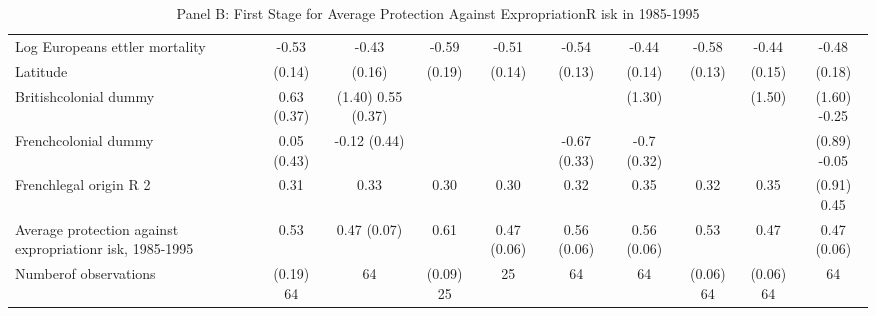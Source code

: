 \begin{table}[htbp]
\centering
\caption{Panel B: First Stage for Average Protection Against ExpropriationR isk in 1985-1995}
\begin{tabular}{lccccccccc}
\hline
Log Europeans ettler mortality & -0.53 & -0.43 & -0.59 & -0.51 & -0.54 & -0.44 & -0.58 & -0.44 & -0.48 \\
Latitude & (0.14) & (0.16) & (0.19) & (0.14) & (0.13) & (0.14) & (0.13) & (0.15) & (0.18) \\
Britishcolonial dummy & 0.63 (0.37) & (1.40) 0.55 (0.37) &  &  &  & (1.30) &  & (1.50) & (1.60) -0.25 \\
Frenchcolonial dummy & 0.05 (0.43) & -0.12 (0.44) &  &  & -0.67 (0.33) & -0.7 (0.32) &  &  & (0.89) -0.05 \\
Frenchlegal origin R 2 & 0.31 & 0.33 & 0.30 & 0.30 & 0.32 & 0.35 & 0.32 & 0.35 & (0.91) 0.45 \\
Average protection against expropriationr isk, 1985-1995 & 0.53 & 0.47 (0.07) & 0.61 & 0.47 (0.06) & 0.56 (0.06) & 0.56 (0.06) & 0.53 & 0.47 & 0.47 (0.06) \\
Numberof observations & (0.19) 64 & 64 & (0.09) 25 & 25 & 64 & 64 & (0.06) 64 & (0.06) 64 & 64 \\
\hline
\end{tabular}
\end{table}
